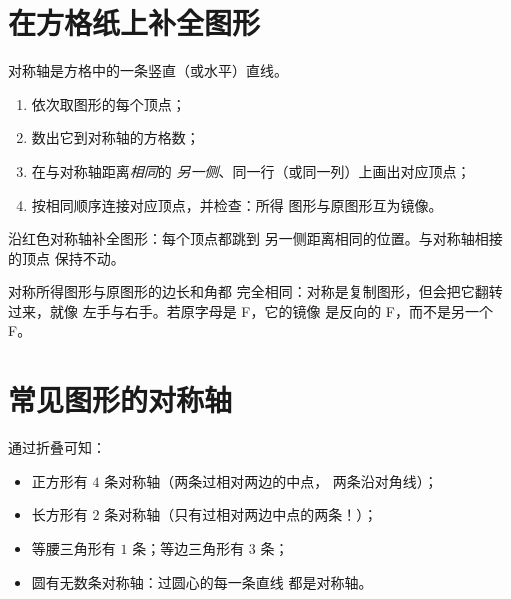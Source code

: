 \section{在方格纸上补全图形}

\begin{method}[关于方格线的轴对称图形]\label{met:g4:symmetry:grid}
对称轴是方格中的一条竖直（或水平）直线。
\begin{enumerate}
  \item 依次取图形的每个顶点；
  \item 数出它到对称轴的方格数；
  \item 在与对称轴距离\emph{相同}的
        \emph{另一侧}、同一行（或同一列）上画出对应顶点；
  \item 按相同顺序连接对应顶点，并检查：所得
        图形与原图形互为镜像。
\end{enumerate}
\end{method}

\begin{omfigure}

{\small 沿红色对称轴补全图形：每个顶点都跳到
另一侧距离相同的位置。与对称轴相接的顶点
保持不动。}
\end{omfigure}

\begin{example}\label{ex:g4:symmetry:properties}
对称所得图形与原图形的边长和角都
完全相同：对称是复制图形，但会把它翻转过来，就像
左手与右手。若原字母是 F，它的镜像
是反向的 F，而不是另一个 F。
\end{example}

\section{常见图形的对称轴}

\begin{example}[数一数对称轴]\label{ex:g4:symmetry:shapes}
通过折叠可知：
\begin{itemize}
  \item 正方形有 $4$ 条对称轴（两条过相对两边的中点，
        两条沿对角线）；
  \item 长方形有 $2$ 条对称轴（只有过相对两边中点的两条！）；
  \item 等腰三角形有 $1$ 条；等边三角形有 $3$ 条；
  \item 圆有无数条对称轴：过圆心的每一条直线
        都是对称轴。
\end{itemize}
\end{example}

